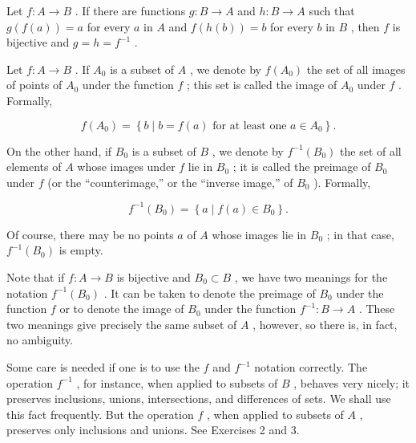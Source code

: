 \begin{lemma} Let \(f : A \rightarrow  B\) . If there are functions \(g : B \rightarrow  A\) and \(h : B \rightarrow  A\) such that \(g\left( {f\left( a\right) }\right)  = a\) for every \(a\) in \(A\) and \(f\left( {h\left( b\right) }\right)  = b\) for every \(b\) in \(B\) , then \(f\) is bijective and \(g = h = {f}^{-1}\) .
\end{lemma}

\begin{definition} Let \(f : A \rightarrow  B\) . If \({A}_{0}\) is a subset of \(A\) , we denote by \(f\left( {A}_{0}\right)\) the set of all images of points of \({A}_{0}\) under the function \(f\) ; this set is called the image of \({A}_{0}\) under \(f\) . Formally,

\[
f\left( {A}_{0}\right)  = \left\{  {b \mid  b = f\left( a\right) \text{ for at least one }a \in  {A}_{0}}\right\}  .
\]

On the other hand, if \({B}_{0}\) is a subset of \(B\) , we denote by \({f}^{-1}\left( {B}_{0}\right)\) the set of all elements of \(A\) whose images under \(f\) lie in \({B}_{0}\) ; it is called the preimage of \({B}_{0}\) under \(f\) (or the ``counterimage,'' or the ``inverse image,'' of \({B}_{0}\) ). Formally,

\[
{f}^{-1}\left( {B}_{0}\right)  = \left\{  {a \mid  f\left( a\right)  \in  {B}_{0}}\right\}  .
\]

Of course, there may be no points \(a\) of \(A\) whose images lie in \({B}_{0}\) ; in that case, \({f}^{-1}\left( {B}_{0}\right)\) is empty.
\end{definition}

Note that if \(f : A \rightarrow  B\) is bijective and \({B}_{0} \subset  B\) , we have two meanings for the notation \({f}^{-1}\left( {B}_{0}\right)\) . It can be taken to denote the preimage of \({B}_{0}\) under the function \(f\) or to denote the image of \({B}_{0}\) under the function \({f}^{-1} : B \rightarrow  A\) . These two meanings give precisely the same subset of \(A\) , however, so there is, in fact, no ambiguity.

Some care is needed if one is to use the \(f\) and \({f}^{-1}\) notation correctly. The operation \({f}^{-1}\) , for instance, when applied to subsets of \(B\) , behaves very nicely; it preserves inclusions, unions, intersections, and differences of sets. We shall use this fact frequently. But the operation \(f\) , when applied to subsets of \(A\) , preserves only inclusions and unions. See Exercises 2 and 3.

